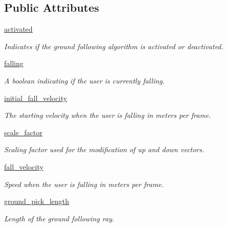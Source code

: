 \subsection*{\-Public \-Attributes}
\begin{DoxyCompactItemize}
\item 
\hyperlink{classlib_1_1GroundFollowing_1_1GroundFollowing_a9977ccb4b08b2f9acdf000fad5fa47b9}{activated}
\begin{DoxyCompactList}\small\item\em \-Indicates if the ground following algorithm is activated or deactivated. \end{DoxyCompactList}\item 
\hyperlink{classlib_1_1GroundFollowing_1_1GroundFollowing_ad93d12deac0e2495f9836630f7d2f611}{falling}
\begin{DoxyCompactList}\small\item\em \-A boolean indicating if the user is currently falling. \end{DoxyCompactList}\item 
\hyperlink{classlib_1_1GroundFollowing_1_1GroundFollowing_afdb7528c0d8ff5d49277e6c70757a9fc}{initial\-\_\-fall\-\_\-velocity}
\begin{DoxyCompactList}\small\item\em \-The starting velocity when the user is falling in meters per frame. \end{DoxyCompactList}\item 
\hyperlink{classlib_1_1GroundFollowing_1_1GroundFollowing_a300eb3b23cb5a995bfb603a2c8a981ff}{scale\-\_\-factor}
\begin{DoxyCompactList}\small\item\em \-Scaling factor used for the modification of up and down vectors. \end{DoxyCompactList}\item 
\hyperlink{classlib_1_1GroundFollowing_1_1GroundFollowing_a64a624d0d290ac48a18046afd5b509f3}{fall\-\_\-velocity}
\begin{DoxyCompactList}\small\item\em \-Speed when the user is falling in meters per frame. \end{DoxyCompactList}\item 
\hyperlink{classlib_1_1GroundFollowing_1_1GroundFollowing_ad4282b9b37472435fc2a508dea180af7}{ground\-\_\-pick\-\_\-length}
\begin{DoxyCompactList}\small\item\em \-Length of the ground following ray. \end{DoxyCompactList}\item 

\end{DoxyCompactItemize}
